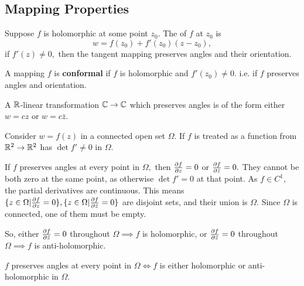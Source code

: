 \documentclass[a4paper,12pt]{article}
\begin{document}
\subsection{Mapping Properties}
Suppose $f$ is holomorphic at some point $z_0.$ The  of $f$ at $z_0$ is \begin{equation}
    w=f(z_0)+f'(z_0)(z-z_0),
\end{equation}
if $f'(z)\neq 0, $ then the tangent mapping preserves angles and their orientation. \begin{definition}
    A mapping $f$ is \textbf{conformal} if $f$ is holomorphic and $f'(z_0)\neq 0$. i.e. if $f$ preserves angles and orientation.
\end{definition}
\begin{lemma}
    A $\mathbb{R}$-linear transformation $\mathbb{C}\to\mathbb{C}$ which preserves angles is of the form either $w=cz$ or $w=c\bar z.$
\end{lemma}
Consider $w=f(z)$ in a connected open set $\Omega.$ If $f$ is treated as a function from $\mathbb{R}^2\to\mathbb{R}^2$ has $\det f'\neq0$ in $\Omega.$

If $f$ preserves angles at every point in $\Omega,$ then $\partialderivative{f}{z}=0$ or $\partialderivative{f}{\bar z}=0.$ They cannot be both zero at the same point, as otherwise $\det f'=0$ at that point. As $f\in C^1,$ the partial derivatives are continuous. This means $\{z\in\Omega|\partialderivative{f}{z}=0\},\{z\in\Omega|\partialderivative{f}{\bar z}=0\}$ are disjoint sets, and their union is $\Omega.$ Since $\Omega$ is connected, one of them must be empty.

So, either $\partialderivative{f}{\bar z}=0$ throughout $\Omega\implies f$ is holomorphic, or $\partialderivative{f}{\bar z}=0$ throughout $\Omega\implies f$ is anti-holomorphic.

\begin{theorem}
    $f$ preserves angles at every point in $\Omega\iff f$ is either holomorphic or anti-holomorphic in $\Omega.$
\end{theorem}
\end{document}
